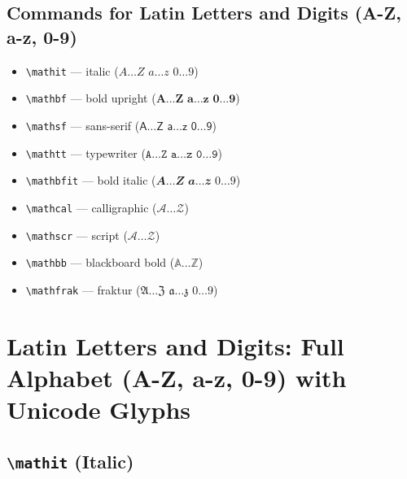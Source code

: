 \documentclass[12pt,a4paper]{article}
\begin{document}
\subsection*{Commands for Latin Letters and Digits (A-Z, a-z, 0-9)}

\begin{itemize}
    \item \texttt{\textbackslash{}mathit} --- italic ($\mathit{A} \ldots \mathit{Z}$ $\mathit{a} \ldots \mathit{z}$ $\mathit{0} \ldots \mathit{9}$)
    \item \texttt{\textbackslash{}mathbf} --- bold upright ($\mathbf{A} \ldots \mathbf{Z}$ $\mathbf{a} \ldots \mathbf{z}$ $\mathbf{0} \ldots \mathbf{9}$)
    \item \texttt{\textbackslash{}mathsf} --- sans-serif ($\mathsf{A} \ldots \mathsf{Z}$ $\mathsf{a} \ldots \mathsf{z}$ $\mathsf{0} \ldots \mathsf{9}$)
    \item \texttt{\textbackslash{}mathtt} --- typewriter ($\mathtt{A} \ldots \mathtt{Z}$ $\mathtt{a} \ldots \mathtt{z}$ $\mathtt{0} \ldots \mathtt{9}$)
    \item \texttt{\textbackslash{}mathbfit} --- bold italic ($\mathbfit{A} \ldots \mathbfit{Z}$ $\mathbfit{a} \ldots \mathbfit{z}$ $\mathbfit{0} \ldots \mathbfit{9}$)
    \item \texttt{\textbackslash{}mathcal} --- calligraphic ($\mathcal{A} \ldots \mathcal{Z}$)
    \item \texttt{\textbackslash{}mathscr} --- script ($\mathscr{A} \ldots \mathscr{Z}$)
    \item \texttt{\textbackslash{}mathbb} --- blackboard bold ($\mathbb{A} \ldots \mathbb{Z}$)
    \item \texttt{\textbackslash{}mathfrak} --- fraktur ($\mathfrak{A} \ldots \mathfrak{Z}$ $\mathfrak{a} \ldots \mathfrak{z}$ $\mathfrak{0} \ldots \mathfrak{9}$)
\end{itemize}

\newpage

\section*{Latin Letters and Digits: Full Alphabet (A-Z, a-z, 0-9) with Unicode Glyphs}

\subsection*{\texttt{\textbackslash{}mathit} (Italic)}
\end{document}
